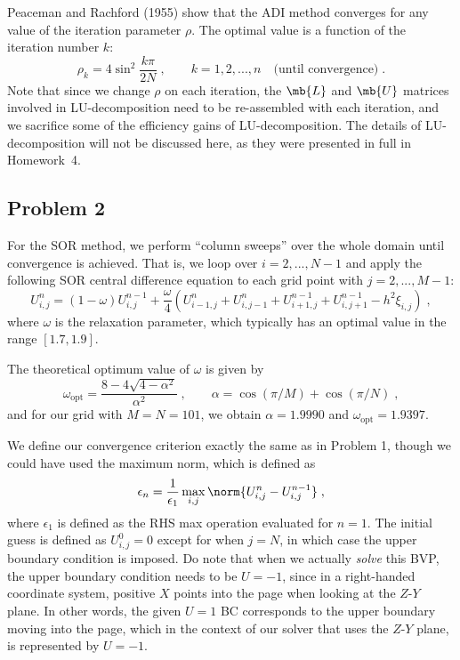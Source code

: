 \documentclass[11pt]{article}
\begin{document}
Peaceman and Rachford (1955) show that the ADI method converges for any value of the iteration parameter $\rho$. The optimal value is a function of the iteration number $k$:
\begin{equation}
\rho_k = 4 \sin^2 \frac{k \pi}{2 N}
\;, \qquad
k = 1, 2, ..., n \quad \text{(until convergence)}
\;.
\end{equation}
Note that since we change $\rho$ on each iteration, the $\mb{L}$ and $\mb{U}$ matrices involved in LU-decomposition need to be re-assembled with each iteration, and we sacrifice some of the efficiency gains of LU-decomposition. The details of LU-decomposition will not be discussed here, as they were presented in full in Homework~4.

\subsection{Problem 2}

For the SOR method, we perform ``column sweeps'' over the whole domain until convergence is achieved. That is, we loop over $i = 2, ..., N-1$ and apply the following SOR central difference equation to each grid point with $j = 2, ..., M-1$:
\begin{equation}
U_{i,j}^{n}
=
\left( 1 - \omega \right) U_{i,j}^{n-1}
+ \frac{\omega}{4}
\left(
  U_{i-1,j}^{n}
+ U_{i,j-1}^{n}
+ U_{i+1,j}^{n-1}
+ U_{i,j+1}^{n-1}
- h^2 \xi_{i,j}
\right)
\;,
\end{equation}
where $\omega$ is the relaxation parameter, which typically has an optimal value in the range $[1.7,1.9]$.

The theoretical optimum value of $\omega$ is given by
\begin{equation}
\omega_\text{opt} = \frac{8 - 4 \sqrt{4 - \alpha^2}}{\alpha^2}
\;,\qquad
\alpha = \cos(\pi/M) + \cos(\pi/N)
\;,
\end{equation}
and for our grid with $M=N=101$, we obtain $\alpha = 1.9990$ and $\omega_\text{opt} = 1.9397$.

We define our convergence criterion exactly the same as in Problem 1, though we could have used the maximum norm, which is defined as
\begin{equation}
\epsilon_n = \frac{1}{\epsilon_1} \max_{i,j} \norm{U_{i,j}^{n} - U_{i,j}^{n-1}}
\;,
\end{equation}
where $\epsilon_1$ is defined as the RHS max operation evaluated for $n=1$. The initial guess is defined as $U_{i,j}^0 = 0$ except for when $j=N$, in which case the upper boundary condition is imposed. Do note that when we actually \emph{solve} this BVP, the upper boundary condition needs to be $U=-1$, since in a right-handed coordinate system, positive $X$ points into the page when looking at the $Z$-$Y$ plane. In other words, the given $U=1$ BC corresponds to the upper boundary moving into the page, which in the context of our solver that uses the $Z$-$Y$ plane, is represented by $U=-1$.
\end{document}
